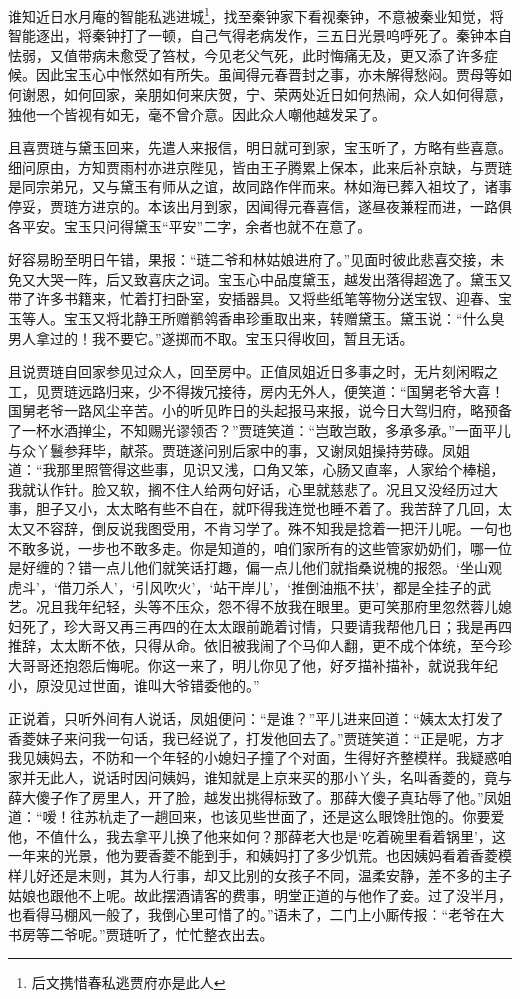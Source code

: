 \documentclass[12pt,oneside]{book}
\begin{document}
谁知近日水月庵的智能私逃进城\footnote{后文携惜春私逃贾府亦是此人}，找至秦钟家下看视秦钟，不意被秦业知觉，将智能逐出，将秦钟打了一顿，自己气得老病发作，三五日光景呜呼死了。秦钟本自怯弱，又值带病未愈受了笞杖，今见老父气死，此时悔痛无及，更又添了许多症候。因此宝玉心中怅然如有所失。虽闻得元春晋封之事，亦未解得愁闷。贾母等如何谢恩，如何回家，亲朋如何来庆贺，宁、荣两处近日如何热闹，众人如何得意，独他一个皆视有如无，毫不曾介意。因此众人嘲他越发呆了。

且喜贾琏与黛玉回来，先遣人来报信，明日就可到家，宝玉听了，方略有些喜意。细问原由，方知贾雨村亦进京陛见，皆由王子腾累上保本，此来后补京缺，与贾琏是同宗弟兄，又与黛玉有师从之谊，故同路作伴而来。林如海已葬入祖坟了，诸事停妥，贾琏方进京的。本该出月到家，因闻得元春喜信，遂昼夜兼程而进，一路俱各平安。宝玉只问得黛玉“平安”二字，余者也就不在意了。

好容易盼至明日午错，果报：“琏二爷和林姑娘进府了。”见面时彼此悲喜交接，未免又大哭一阵，后又致喜庆之词。宝玉心中品度黛玉，越发出落得超逸了。黛玉又带了许多书籍来，忙着打扫卧室，安插器具。又将些纸笔等物分送宝钗、迎春、宝玉等人。宝玉又将北静王所赠鹡鸰香串珍重取出来，转赠黛玉。黛玉说：“什么臭男人拿过的！我不要它。”遂掷而不取。宝玉只得收回，暂且无话。

且说贾琏自回家参见过众人，回至房中。正值凤姐近日多事之时，无片刻闲暇之工，见贾琏远路归来，少不得拨冗接待，房内无外人，便笑道：“国舅老爷大喜！国舅老爷一路风尘辛苦。小的听见昨日的头起报马来报，说今日大驾归府，略预备了一杯水酒掸尘，不知赐光谬领否？”贾琏笑道：“岂敢岂敢，多承多承。”一面平儿与众丫鬟参拜毕，献茶。贾琏遂问别后家中的事，又谢凤姐操持劳碌。凤姐道：“我那里照管得这些事，见识又浅，口角又笨，心肠又直率，人家给个棒槌，我就认作针。脸又软，搁不住人给两句好话，心里就慈悲了。况且又没经历过大事，胆子又小，太太略有些不自在，就吓得我连觉也睡不着了。我苦辞了几回，太太又不容辞，倒反说我图受用，不肯习学了。殊不知我是捻着一把汗儿呢。一句也不敢多说，一步也不敢多走。你是知道的，咱们家所有的这些管家奶奶们，哪一位是好缠的？错一点儿他们就笑话打趣，偏一点儿他们就指桑说槐的报怨。‘坐山观虎斗’，‘借刀杀人’，‘引风吹火’，‘站干岸儿’，‘推倒油瓶不扶’，都是全挂子的武艺。况且我年纪轻，头等不压众，怨不得不放我在眼里。更可笑那府里忽然蓉儿媳妇死了，珍大哥又再三再四的在太太跟前跪着讨情，只要请我帮他几日；我是再四推辞，太太断不依，只得从命。依旧被我闹了个马仰人翻，更不成个体统，至今珍大哥哥还抱怨后悔呢。你这一来了，明儿你见了他，好歹描补描补，就说我年纪小，原没见过世面，谁叫大爷错委他的。”

正说着，只听外间有人说话，凤姐便问：“是谁？”平儿进来回道：“姨太太打发了香菱妹子来问我一句话，我已经说了，打发他回去了。”贾琏笑道：“正是呢，方才我见姨妈去，不防和一个年轻的小媳妇子撞了个对面，生得好齐整模样。我疑惑咱家并无此人，说话时因问姨妈，谁知就是上京来买的那小丫头，名叫香菱的，竟与薛大傻子作了房里人，开了脸，越发出挑得标致了。那薛大傻子真玷辱了他。”凤姐道：“嗳！往苏杭走了一趟回来，也该见些世面了，还是这么眼馋肚饱的。你要爱他，不值什么，我去拿平儿换了他来如何？那薛老大也是‘吃着碗里看着锅里’，这一年来的光景，他为要香菱不能到手，和姨妈打了多少饥荒。也因姨妈看着香菱模样儿好还是末则，其为人行事，却又比别的女孩子不同，温柔安静，差不多的主子姑娘也跟他不上呢。故此摆酒请客的费事，明堂正道的与他作了妾。过了没半月，也看得马棚风一般了，我倒心里可惜了的。”语未了，二门上小厮传报︰“老爷在大书房等二爷呢。”贾琏听了，忙忙整衣出去。
\end{document}
